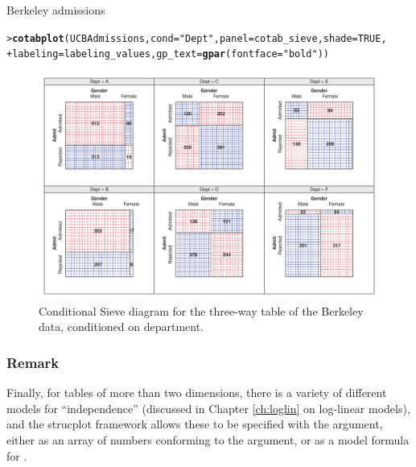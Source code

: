 \documentclass[10pt,krantz2]{krantz}\usepackage[]{graphicx}\usepackage[]{color}
\makeatletter
\newcommand{\hlnum}[1]{\textcolor[rgb]{0.686,0.059,0.569}{#1}}%
\newcommand{\hlstr}[1]{\textcolor[rgb]{0.192,0.494,0.8}{#1}}%
\newcommand{\hlstd}[1]{\textcolor[rgb]{0.345,0.345,0.345}{#1}}%
\newcommand{\hlkwc}[1]{\textcolor[rgb]{0.333,0.667,0.333}{#1}}%
\newcommand{\hlkwd}[1]{\textcolor[rgb]{0.737,0.353,0.396}{\textbf{#1}}}%
\newenvironment{kframe}{%
 \def\at@end@of@kframe{}%
 \ifinner\ifhmode%
  \def\at@end@of@kframe{\end{minipage}}%
  \begin{minipage}{\columnwidth}%
 \fi\fi%
 \def\FrameCommand##1{\hskip\@totalleftmargin \hskip-\fboxsep
 \colorbox{shadecolor}{##1}\hskip-\fboxsep
     \hskip-\linewidth \hskip-\@totalleftmargin \hskip\columnwidth}%
 \MakeFramed {\advance\hsize-\width
   \@totalleftmargin\z@ \linewidth\hsize
   \@setminipage}}%
 {\par\unskip\endMakeFramed%
 \at@end@of@kframe}
\newenvironment{knitrout}{}{} %
\renewenvironment{knitrout}{\small\renewcommand{\baselinestretch}{.85}}{} %
\makeatother
\begin{document}
\begin{Example}[berkeley3]{Berkeley admissions}
\begin{knitrout}
\end{knitrout}
\begin{knitrout}
\color{fgcolor}\begin{kframe}
\begin{alltt}
\hlstd{> }\hlkwd{cotabplot}\hlstd{(UCBAdmissions,} \hlkwc{cond} \hlstd{=} \hlstr{"Dept"}\hlstd{,} \hlkwc{panel} \hlstd{= cotab_sieve,} \hlkwc{shade} \hlstd{=} \hlnum{TRUE}\hlstd{,}
\hlstd{+ }          \hlkwc{labeling} \hlstd{= labeling_values,} \hlkwc{gp_text} \hlstd{=} \hlkwd{gpar}\hlstd{(}\hlkwc{fontface} \hlstd{=} \hlstr{"bold"}\hlstd{))}
\end{alltt}
\end{kframe}\begin{figure}[!htbp]

\centerline{\includegraphics[width=\textwidth]{ch04/fig/berkeley-cotabsieve2-1} }

\caption[Conditional Sieve diagram for the three-way table of the Berkeley data, conditioned on department]{Conditional Sieve diagram for the three-way table of the Berkeley data, conditioned on department.\label{fig:berkeley-cotabsieve2}}
\end{figure}


\end{knitrout}

\subsubsection*{Remark}

Finally, for tables of more than two dimensions, there is a variety of
different models for ``independence'' (discussed in Chapter \ref{ch:loglin}
on log-linear models), and the strucplot framework
allows these to be specified with the  argument,
either as an array of numbers conforming to the 
argument, or as a model formula for .


\end{Example}
\end{document}
